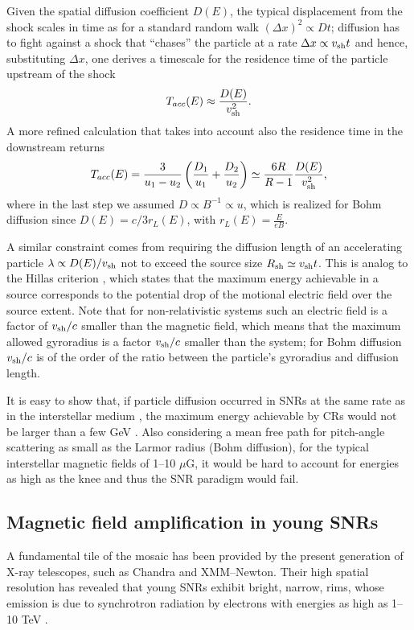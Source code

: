 \documentclass[varenna]{cimento}
\newcommand{\vsh}{v_{\rm sh}}
\begin{document}
Given the spatial diffusion coefficient $D(E)$, the typical displacement from the shock scales in time as for a standard random walk $(\Delta x)^2\propto Dt$;
diffusion has to fight against a shock that ``chases'' the particle at a rate $\Delta x\propto \vsh t$ and hence, substituting  $\Delta x$, one derives a timescale for the residence time of the particle upstream of the shock 
\begin{equation}
    T_{acc}(E)\approx \frac{D(E)}{\vsh^2}.
\end{equation}
A more refined calculation that takes into account also the residence time in the downstream \cite{lagage+83a} returns
\begin{equation}
     T_{acc}(E)= \frac{3}{u_1-u_2}\left(\frac{D_1}{u_1}+\frac{D_2}{u_2}\right)\simeq \frac{6R}{R-1}\frac{D(E)}{\vsh^2},
\end{equation}
where in the last step we assumed $D\propto B^{-1}\propto u$, 
which is realized for Bohm diffusion since $D(E)=c/3 r_L(E)$, with $r_L(E)=\frac{E}{eB}$.

A similar constraint comes from requiring the diffusion length of an accelerating particle $\lambda\propto D(E)/\vsh$ not to exceed the source size $R_{\rm sh}\simeq \vsh t$.
This is analog to the Hillas criterion \cite{hillas84}, which states that the maximum energy achievable in a source corresponds to the potential drop of the motional electric field over the source extent. 
Note that for non-relativistic systems such an electric field is a factor of $\vsh/c$ smaller than the magnetic field, which means that the maximum allowed gyroradius is a factor $\vsh/c$ smaller than the system; 
for Bohm diffusion $\vsh/c$ is of the order of the ratio between the particle's gyroradius and diffusion length.

It is easy to show that, if particle diffusion occurred in SNRs at the same rate as in the interstellar medium \cite{evoli+21}, the maximum energy achievable by CRs would not be larger than a few GeV \cite{blasi05}.
Also considering a mean free path for pitch-angle scattering as small as the Larmor radius (Bohm diffusion), for the typical interstellar magnetic fields of 1--10 $\mu$G, it would be hard to account for energies as high as the knee \cite{lagage+83a,lagage+83b} and thus the SNR paradigm would fail.


\subsection{Magnetic field amplification in young SNRs}
A fundamental tile of the mosaic has been provided by the present generation of X-ray telescopes, such as Chandra and XMM--Newton.
Their high spatial resolution has revealed that young SNRs exhibit bright, narrow, rims, whose emission is due to synchrotron radiation by electrons with energies as high as 1--10 TeV \cite{morlino+10,ressler+14}.
\end{document}
